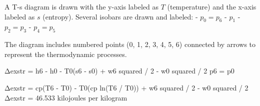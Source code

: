 A T-s diagram is drawn with the y-axis labeled as \( T \) (temperature) and the x-axis labeled as \( s \) (entropy). Several isobars are drawn and labeled:  
- \( p_0 = p_6 \)  
- \( p_1 \)  
- \( p_2 = p_3 \)  
- \( p_4 = p_5 \)  

The diagram includes numbered points (0, 1, 2, 3, 4, 5, 6) connected by arrows to represent the thermodynamic processes.

Δexstr = h6 - h0 - T0(s6 - s0) + w6 squared / 2 - w0 squared / 2  
p6 = p0  

Δexstr = cp(T6 - T0) - T0(cp ln(T6 / T0)) + w6 squared / 2 - w0 squared / 2  
Δexstr = 46.533 kilojoules per kilogram
